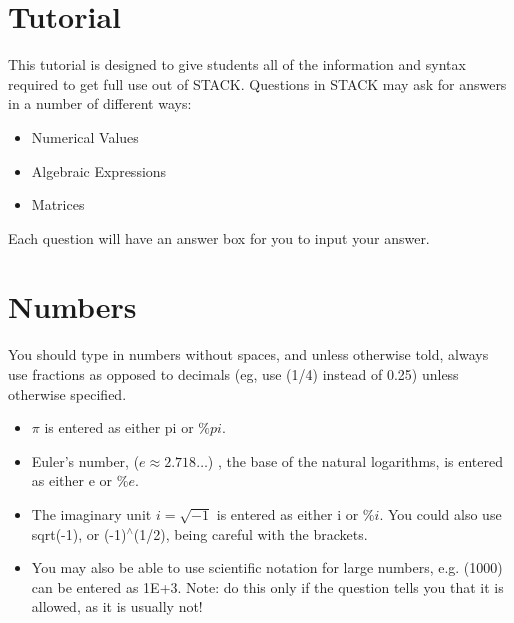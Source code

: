 \documentclass[a4paper]{article}
\begin{document}
\begin{multicols}{2}
\section*{Tutorial}
This tutorial is designed to give students all of the information and syntax required to get full use out of STACK. Questions in STACK may ask for answers in a number of different ways:
\begin{itemize}
\item Numerical Values
\item Algebraic Expressions
\item Matrices
\end{itemize}
Each question will have an answer box for you to input your answer.

\section*{Numbers}
You should type in numbers without spaces, and unless otherwise told, always use fractions as opposed to decimals (eg, use (1/4) instead of 0.25) unless otherwise specified.
\begin{itemize}
\item $\pi$ is entered as either pi or $\%pi$.
\item Euler's number, ($e \approx 2.718 \dots$) , the base of the natural logarithms, is entered as either e or $\%e$.
\item The imaginary unit $i=\sqrt{-1}$ is entered as either i or $\%i$. You could also use sqrt(-1), or (-1)$^{\wedge}$(1/2), being careful with the brackets.
\item You may also be able to use scientific notation for large numbers, e.g. (1000) can be entered as 1E+3. Note: do this only if the question tells you that it is allowed, as it is usually not!
\end{itemize}


\end{multicols}
\end{document}
